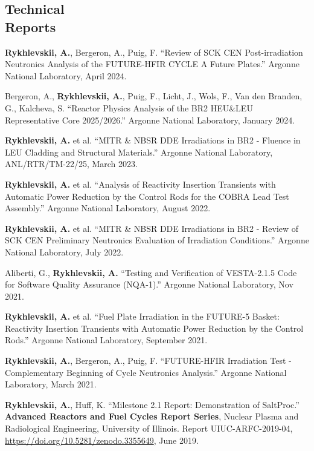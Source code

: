\documentclass[margin,line]{resume}
\begin{document}
\begin{resume}
\section{\mysidestyle Technical\\Reports}
\begin{bibenum}
    \item \textbf{Rykhlevskii, A.}, Bergeron, A., Puig, F. 
    ``Review of SCK CEN Post-irradiation Neutronics Analysis of the FUTURE-HFIR CYCLE A Future Plates.''
	Argonne National Laboratory, April 2024.
    \item Bergeron, A., \textbf{Rykhlevskii, A.}, Puig, F., Licht, J., Wols, F., Van den Branden, G., Kalcheva, S. ``Reactor Physics Analysis of the BR2 HEU\&LEU Representative Core 2025/2026.''
	Argonne National Laboratory, January 2024.
    \item \textbf{Rykhlevskii, A.} et al. ``MITR \& NBSR DDE Irradiations in BR2 - Fluence in LEU
    Cladding and Structural Materials.''
	Argonne National Laboratory, ANL/RTR/TM-22/25, March 2023.
    \item \textbf{Rykhlevskii, A.} et al. ``Analysis of Reactivity Insertion Transients with
    Automatic Power Reduction by the Control Rods for the COBRA Lead Test Assembly.''
	Argonne National Laboratory, August 2022.
    \item \textbf{Rykhlevskii, A.} et al. ``MITR \& NBSR DDE Irradiations in BR2 - Review of
    SCK CEN Preliminary Neutronics Evaluation of Irradiation Conditions.''
	Argonne National Laboratory, July 2022.
	\item Aliberti, G., \textbf{Rykhlevskii, A.} ``Testing and Verification of VESTA-2.1.5
	Code for Software Quality Assurance (NQA-1).''
	Argonne National Laboratory, Nov 2021. 
	\item \textbf{Rykhlevskii, A.} et al. ``Fuel Plate Irradiation
	in the FUTURE-5 Basket: Reactivity Insertion Transients with
	Automatic Power Reduction by the Control Rods.''
	Argonne National Laboratory, September 2021.
	\item \textbf{Rykhlevskii, A.}, Bergeron, A., Puig, F. ``FUTURE-HFIR 
	Irradiation Test - Complementary Beginning of Cycle Neutronics Analysis.''
	Argonne National Laboratory, March 2021.
	\item \textbf{Rykhlevskii, A.}, Huff, K. ``Milestone 2.1 Report: 
	Demonstration of 
	SaltProc.'' \textbf{Advanced Reactors and Fuel Cycles Report Series}, 
	Nuclear Plasma and Radiological Engineering, University of Illinois.  
	Report UIUC-ARFC-2019-04, \url{https://doi.org/10.5281/zenodo.3355649}, 
	June 2019.
\end{bibenum}

\end{resume}
\end{document}
